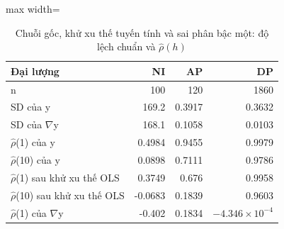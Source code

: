 \begin{table}[H]
\centering\footnotesize
\caption{Chuỗi gốc, khử xu thế tuyến tính và sai phân bậc một: độ lệch chuẩn và $\hat\rho(h)$}\label{tab:tab_b12_01_levels_vs_differences}
\begin{adjustbox}{max width=\linewidth}
\begin{tabular}{|l|r|r|r|}
\toprule
Đại lượng & NI & AP & DP \\
\midrule
n & 100 & 120 & 1860 \\
SD của y & 169.2 & 0.3917 & 0.3632 \\
SD của $\nabla$y & 168.1 & 0.1058 & 0.0103 \\
$\hat{\rho}$(1) của y & 0.4984 & 0.9455 & 0.9979 \\
$\hat{\rho}$(10) của y & 0.0898 & 0.7111 & 0.9786 \\
$\hat{\rho}$(1) sau khử xu thế OLS & 0.3749 & 0.676 & 0.9958 \\
$\hat{\rho}$(10) sau khử xu thế OLS & -0.0683 & 0.1839 & 0.9603 \\
$\hat{\rho}$(1) của $\nabla$y & -0.402 & 0.1834 & $-4.346\times10^{-4}$ \\
\bottomrule
\end{tabular}
\end{adjustbox}
\end{table}
